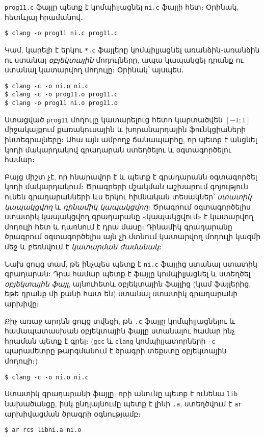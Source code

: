 \texttt{prog11.c} ֆայլը պետք է կոմպիլյացնել \texttt{ni.c}
ֆայլի հետ։ Օրինակ, հետևյալ հրամանով․

\begin{Verbatim}
$ clang -o prog11 ni.c prog11.c
\end{Verbatim}

Կամ, կարելի է երկու \Verb|*.c| ֆայլերը կոմպիլյացնել առանձին֊առանձին
ու ստանալ \emph{օբյեկտային} մոդուլները, ապա կապակցել դրանք ու ստանալ
կատարվող մոդուլը։ Օրինակ՝ այսպես․

\begin{Verbatim}
$ clang -c -o ni.o ni.c
$ clang -c -o prog11.o prog11.c
$ clang -o prog11 ni.o prog11.o
\end{Verbatim}

Ստացված \texttt{prog11} մոդուլը կատարելուց հետո կարտածվեն
\([-1;1]\) միջակայքում քառակուսային և խորանարդային ֆունկցիաների
ինտեգրալները։ Ահա այն ամբողջ ճանապարհը, որ պետք է անցնել կոդի
մակարդակով գրադարան ստեղծելու և օգտագործելու համար։

Բայց միշտ չէ, որ հնարավոր է և պետք է գրադարանն օգտագործել կոդի
մակարդակում։ Ծրագրերի մշակման աշխարում գոյություն ունեն
գրադարանների ևս երկու հիմնական տեսակներ՝ \emph{ստատիկ կապակցվող}
և \emph{դինամիկ կապակցվող}։ Ծրագրում օգտագործելիս ստատիկ կապակցվող
գրադարանը «կապակցվում» է կատարվող մոդուլի հետ և դառնում է դրա
մասը։ Դինամիկ գրադարանը ծրագրում օգտագործելիս այն չի մտնում
կատարվող մոդուլի կազմի մեջ և բեռնվում է \emph{կատարման ժամանակ}։

Նախ ցույց տամ, թե ինչպես պետք է \texttt{ni.c} ֆայլից ստանալ
ստատիկ գրադարան։ Դրա համար պետք է ֆայլը կոմպիլյացնել և ստեղծել
\emph{օբյեկտային ֆայլ}, այնուհետև օբյեկտային ֆայլից (կամ ֆայլերից,
եթե դրանք մի քանի հատ են) ստանալ ստատիկ գրադարանի արխիվը։

Քիչ առաջ արդեն ցույց տվեցի, թե \Verb|.c| ֆայլը կոմպիլյացնելու
և համապատասխան օբյեկտային ֆայլը ստանալու համար ինչ հրաման պետք
է գրել։ (\texttt{gcc} և \texttt{clang} կոմպիլյատորների \Verb|-c|
պարամետրը թարգմանում է ծրագրի տեքստը օբյեկտային մոդուլի։)

\begin{Verbatim}
$ clang -c -o ni.o ni.c
\end{Verbatim}

Ստատիկ գրադարանի ֆայլը, որի անունը պետք է ունենա \texttt{lib}
նախածանցը, իսկ ընդլայնումը պետք է լինի \Verb|.a|, ստեղծվում է
\texttt{ar} արխիվացման ծրագրի օգնությամբ։

\begin{Verbatim}
$ ar rcs libni.a ni.o
\end{Verbatim}


